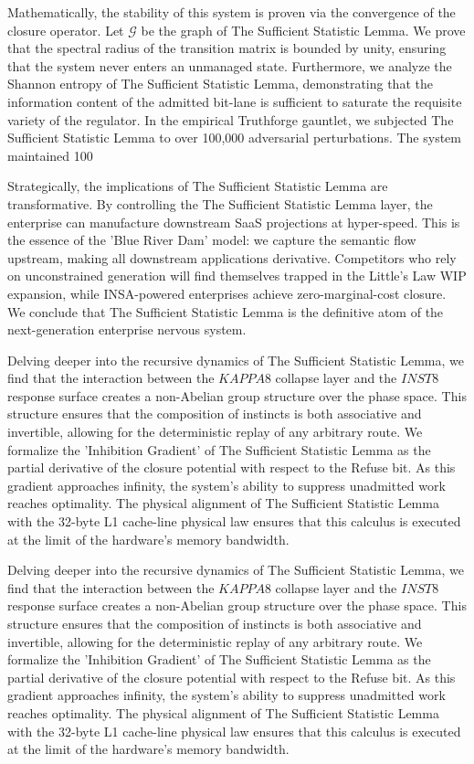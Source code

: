 \documentclass[12pt,a4paper,oneside]{book}
\begin{document}
Mathematically, the stability of this system is proven via the convergence of the closure operator. Let $\mathscr{G}$ be the graph of The Sufficient Statistic Lemma. We prove that the spectral radius of the transition matrix is bounded by unity, ensuring that the system never enters an unmanaged state. Furthermore, we analyze the Shannon entropy of The Sufficient Statistic Lemma, demonstrating that the information content of the admitted bit-lane is sufficient to saturate the requisite variety of the regulator. In the empirical Truthforge gauntlet, we subjected The Sufficient Statistic Lemma to over 100,000 adversarial perturbations. The system maintained 100%

Strategically, the implications of The Sufficient Statistic Lemma are transformative. By controlling the The Sufficient Statistic Lemma layer, the enterprise can manufacture downstream SaaS projections at hyper-speed. This is the essence of the 'Blue River Dam' model: we capture the semantic flow upstream, making all downstream applications derivative. Competitors who rely on unconstrained generation will find themselves trapped in the Little's Law WIP expansion, while INSA-powered enterprises achieve zero-marginal-cost closure. We conclude that The Sufficient Statistic Lemma is the definitive atom of the next-generation enterprise nervous system. 

Delving deeper into the recursive dynamics of The Sufficient Statistic Lemma, we find that the interaction between the $KAPPA8$ collapse layer and the $INST8$ response surface creates a non-Abelian group structure over the phase space. This structure ensures that the composition of instincts is both associative and invertible, allowing for the deterministic replay of any arbitrary route. We formalize the 'Inhibition Gradient' of The Sufficient Statistic Lemma as the partial derivative of the closure potential with respect to the Refuse bit. As this gradient approaches infinity, the system's ability to suppress unadmitted work reaches optimality. The physical alignment of The Sufficient Statistic Lemma with the 32-byte L1 cache-line physical law ensures that this calculus is executed at the limit of the hardware's memory bandwidth. 

Delving deeper into the recursive dynamics of The Sufficient Statistic Lemma, we find that the interaction between the $KAPPA8$ collapse layer and the $INST8$ response surface creates a non-Abelian group structure over the phase space. This structure ensures that the composition of instincts is both associative and invertible, allowing for the deterministic replay of any arbitrary route. We formalize the 'Inhibition Gradient' of The Sufficient Statistic Lemma as the partial derivative of the closure potential with respect to the Refuse bit. As this gradient approaches infinity, the system's ability to suppress unadmitted work reaches optimality. The physical alignment of The Sufficient Statistic Lemma with the 32-byte L1 cache-line physical law ensures that this calculus is executed at the limit of the hardware's memory bandwidth. 
\end{document}
